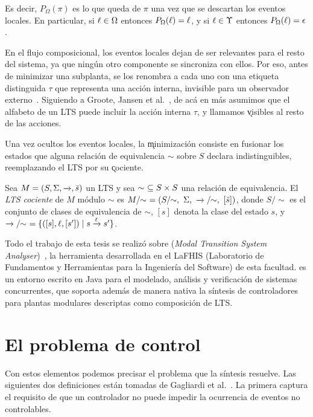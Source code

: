 Es decir, $P_{\Omega}(\pi)$ es lo que queda de $\pi$ una vez que se descartan los eventos
locales. En particular, si $\ell \in \Omega$ entonces $P_{\Omega}(\ell) = \ell$, y si
$\ell \in \Upsilon$ entonces $P_{\Omega}(\ell) = \epsilon$.

\medskip

En el flujo composicional, los eventos locales dejan de ser relevantes para el resto del
sistema, ya que ningún otro componente se sincroniza con ellos. Por eso, antes de minimizar una
subplanta, se los renombra a cada uno con una etiqueta
distinguida $\tau$ que representa una acción interna, invisible para un observador
externo~\cite{wsoe}. Siguiendo a Groote, Jansen et al.~\cite{groote2019}, de acá en más
asumimos que el alfabeto de un LTS puede incluir la acción interna $\tau$, y llamamos
\k{visibles} al resto de las acciones.

Una vez ocultos los eventos locales, la \k{minimización} consiste en fusionar los estados que
alguna relación de equivalencia $\sim$ sobre $S$ declara indistinguibles, reemplazando el LTS
por su \k{cociente}.

\begin{definition}
\label{def:cociente}
Sea $M = (S, \Sigma, \pijl{}, \init{s})$ un LTS y sea $\sim\ \subseteq S \times S$ una relación de
equivalencia. El \textit{LTS cociente} de $M$ módulo $\sim$ es
$M/\!\!\sim\ = (S/\!\!\sim,\ \Sigma,\ \pijl{}/\!\!\sim,\ [\init{s}])$, donde $S/\!\!\sim$ es
el conjunto de clases de equivalencia de $\sim$, $[s]$ denota la clase del estado $s$, y
$\pijl{}/\!\!\sim\ = \{([s], \l, [s']) \mid s \pijl{\l} s'\}$.
\end{definition}

\medskip


Todo el trabajo de esta tesis se realizó sobre \MTSA{} (\textit{Modal Transition System
Analyser})~\cite{mtsa}, la herramienta desarrollada en el LaFHIS (Laboratorio de Fundamentos y
Herramientas para la Ingeniería del Software) de esta facultad. \MTSA{} es un entorno escrito en
Java para el modelado, análisis y verificación de sistemas concurrentes, que soporta además de
manera nativa la síntesis de controladores para plantas modulares descriptas como composición de
LTS. 

\section{El problema de control}
\label{sec:problema-control}

Con estos elementos podemos precisar el problema que la síntesis resuelve. Las siguientes dos
definiciones están tomadas de Gagliardi et al.~\cite{compositional}. La primera captura el
requisito de que un controlador no puede impedir la ocurrencia de eventos no controlables.

